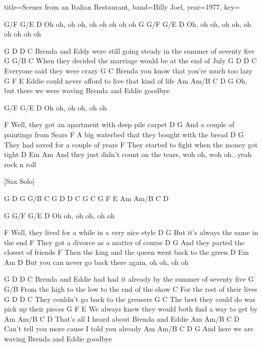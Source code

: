 \documentclass{skrul-leadsheet}
\begin{document}
\begin{song}[transpose-capo=true]{title={Scenes from an Italian Restaurant}, band={Billy Joel}, year={1977}, key={}}
 
   G/F    G/E    D
Oh oh, oh oh, oh oh oh oh oh
G      G/F    G/E    D
Oh, oh oh, oh oh, oh oh oh oh oh
 
 
G                                              D                      D C
Brenda and Eddy were still going steady in the summer of seventy five
G                     G/B                      C
When they decided the marriage would be at the end of July
G                       D     D C
Everyone said they were crazy
G                           C
Brenda you know that you're much too lazy
G                   F                         E
Eddie could never afford to live that kind of life
        Am            Am/B   C          D         G
Oh, but there we were waving Brenda and Eddie goodbye
 
 
   G/F    G/E    D
Oh oh, oh oh, oh oh
 
 
           F
Well, they got an apartment with deep pile carpet
      D                        G
And a couple of paintings from Sears
  F
A big waterbed that they bought with the bread
         D                     G
They had saved for a couple of years
     F
They started to fight when the money got tight
         D                        Em         Am
And they just didn't count on the tears, woh oh, woh oh...yeah rock n roll
 
 
[Sax Solo]
 
           G  D
           G  G/B  C
           G  D  D C
           G  C
           G  F  E
           Am  Am/B  C  D
 
 
G  G/F    G/E    D
Oh oh, oh oh, oh oh
 
 
           F
Well, they lived for a while in a very nice style
         D                         G
But it's always the same in the end
     F
They got a divorce as a matter of course
         D                            G
And they parted the closest of friends
         F
Then the king and the queen went back to the green
            D                    Em       Am     D
But you can never go back there again, oh oh, oh oh
 
 
G                                          D                     D C
Brenda and Eddie had had it already by the summer of seventy five
         G                      G/B
From the high to the low to the end of the show
        C
For the rest of their lives
     G                       D       D C
They couldn't go back to the greasers
    G                           C
The best they could do was pick up their pieces
G                         F                      E
We always knew they would both find a way to get by
Am           Am/B        C          D
That's all I heard about Brenda and Eddie
Am             Am/B         C          D
Can't tell you more cause I told you already
    Am          Am/B   C          D         G
And here we are waving Brenda and Eddie goodbye
 

\end{song}
\end{document}
